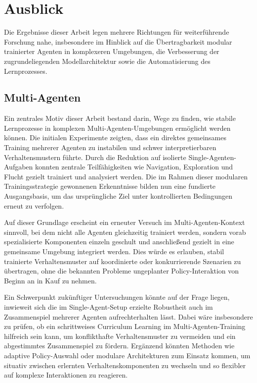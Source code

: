 \chapter{Ausblick}
\label{chap:ausblick}

Die Ergebnisse dieser Arbeit legen mehrere Richtungen für weiterführende Forschung nahe, insbesondere im Hinblick auf die Übertragbarkeit modular trainierter Agenten in komplexeren Umgebungen, die Verbesserung der zugrundeliegenden Modellarchitektur sowie die Automatisierung des Lernprozesses.

\section{Multi-Agenten}

Ein zentrales Motiv dieser Arbeit bestand darin, Wege zu finden, wie stabile Lernprozesse in komplexen Multi-Agenten-Umgebungen ermöglicht werden können. Die initialen Experimente zeigten, dass ein direktes gemeinsames Training mehrerer Agenten zu instabilen und schwer interpretierbaren Verhaltensmustern führte. Durch die Reduktion auf isolierte Single-Agenten-Aufgaben konnten zentrale Teilfähigkeiten wie Navigation, Exploration und Flucht gezielt trainiert und analysiert werden. Die im Rahmen dieser modularen Trainingsstrategie gewonnenen Erkenntnisse bilden nun eine fundierte Ausgangsbasis, um das ursprüngliche Ziel unter kontrollierten Bedingungen erneut zu verfolgen.

Auf dieser Grundlage erscheint ein erneuter Versuch im Multi-Agenten-Kontext sinnvoll, bei dem nicht alle Agenten gleichzeitig trainiert werden, sondern vorab spezialisierte Komponenten einzeln geschult und anschließend gezielt in eine gemeinsame Umgebung integriert werden. Dies würde es erlauben, stabil trainierte Verhaltensmuster auf koordinierte oder konkurrierende Szenarien zu übertragen, ohne die bekannten Probleme ungeplanter Policy-Interaktion von Beginn an in Kauf zu nehmen.

Ein Schwerpunkt zukünftiger Untersuchungen könnte auf der Frage liegen, inwieweit sich die im Single-Agent-Setup erzielte Robustheit auch im Zusammenspiel mehrerer Agenten aufrechterhalten lässt. Dabei wäre insbesondere zu prüfen, ob ein schrittweises Curriculum Learning im Multi-Agenten-Training hilfreich sein kann, um konflikthafte Verhaltensmuster zu vermeiden und ein abgestimmtes Zusammenspiel zu fördern. Ergänzend könnten Methoden wie adaptive Policy-Auswahl oder modulare Architekturen zum Einsatz kommen, um situativ zwischen erlernten Verhaltenskomponenten zu wechseln und so flexibler auf komplexe Interaktionen zu reagieren.

